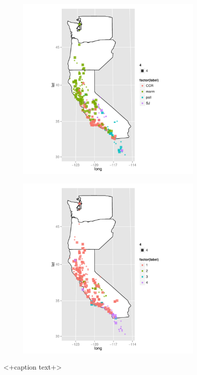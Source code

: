 \documentclass{article}\usepackage{graphicx, color}
\begin{document}
\begin{figure}[t]
  \begin{subfigure}[b]{0.5\textwidth}
    \centering
    \caption{}
    \includegraphics[width = \textwidth]{figure/rf-map3}
    \label{fig:rf-map3}
  \end{subfigure}%
  \begin{subfigure}[b]{0.5\textwidth}
    \centering
    \caption{}
    \includegraphics[width = \textwidth]{figure/rf-map4}
    \label{fig:rf-map4}
  \end{subfigure}
  \caption{<+caption text+>}
  \label{fig:rf-map}
\end{figure}
\end{document}

